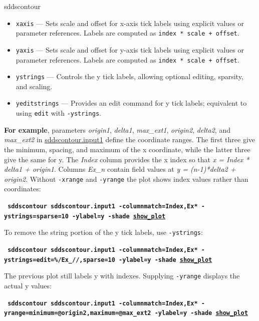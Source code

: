 \begin{sddsprog}{sddscontour}
\begin{itemize}
\begin{itemize}
                If \verb|-yrange| is provided, the y tick labels will be numerically labeled with the provided range.
        \item \verb|xaxis| --- Sets scale and offset for x-axis tick labels using explicit values or parameter references. Labels are computed as \verb|index * scale + offset|.
        \item \verb|yaxis| --- Sets scale and offset for y-axis tick labels using explicit values or parameter references. Labels are computed as \verb|index * scale + offset|.
        \item \verb|ystrings| --- Controls the y tick labels, allowing optional editing, sparsity, and scaling.
        \item \verb|yeditstrings| --- Provides an edit command for y tick labels; equivalent to using \verb|edit| with \verb|-ystrings|.
        \end{itemize}
        {\bf For example}, parameters {\em origin1}, {\em delta1}, {\em max\_ext1}, {\em origin2}, {\em delta2}, and {\em max\_ext2} in \href{https://ops.aps.anl.gov/manuals/example_files/sddscontour.input1}{sddscontour.input1} define the coordinate ranges.
        The first three give the minimum, spacing, and maximum of the x coordinate, while the latter three give the same for y.
        The {\em Index} column provides the x index so that {\em x = Index * delta1 + origin1}.  Columns {\em Ex\_n} contain field
        values at {\em y = (n-1)*delta2 + origin2}.  Without \verb|-xrange| and \verb|-yrange| the plot shows index values rather
        than coordinates:
        \begin{flushleft}{\tt \bf
            sddscontour sddscontour.input1 -columnmatch=Index,Ex* -ystrings=sparse=10 -ylabel=y -shade
            \href{https://ops.aps.anl.gov/manuals/example_files/sddscontour1_img.html}{show\_plot}
        }\end{flushleft}

        To remove the string portion of the y tick labels, use \verb|-ystrings|:
        \begin{flushleft}{\tt \bf
            sddscontour sddscontour.input1 -columnmatch=Index,Ex* -ystrings=edit=\%/Ex\_//,sparse=10 -ylabel=y -shade
            \href{https://ops.aps.anl.gov/manuals/example_files/sddscontour2_img.html}{show\_plot}
        }\end{flushleft}

        The previous plot still labels y with indexes.  Supplying \verb|-yrange| displays the actual y values:
        \begin{flushleft}{\tt \bf
            sddscontour sddscontour.input1 -columnmatch=Index,Ex* -yrange=minimum=@origin2,maximum=@max\_ext2 -ylabel=y -shade
            \href{https://ops.aps.anl.gov/manuals/example_files/sddscontour3_img.html}{show\_plot}
        }\end{flushleft}


\end{itemize}
\end{sddsprog}
